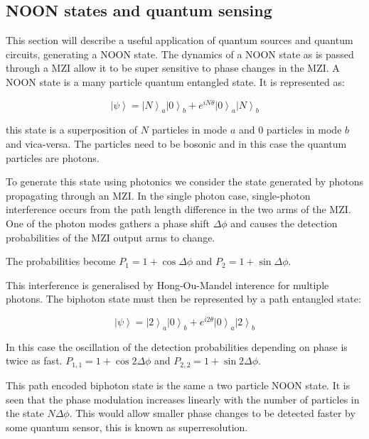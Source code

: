 \subsection{NOON states and quantum sensing}

This section will describe a useful application of quantum sources and quantum
circuits, generating a NOON state. The dynamics of a NOON state as is passed
through a MZI allow it to be super sensitive to phase changes in the MZI.
A NOON state is a many particle quantum entangled state. It is represented as:

\begin{equation} \left|\psi\right\rangle = \left|N\right\rangle_{a}
\left|0\right\rangle_{b} + e^{iN\theta} \left|0\right\rangle_{a}
\left|N\right\rangle_{b} \end{equation}

this state is a superposition of $N$ particles in mode $a$ and 0 particles in
mode $b$ and vica-versa. The particles need to be bosonic and in this case the
quantum particles are photons.

To generate this state using photonics we consider the state generated by
photons propagating through an MZI. In the single photon case, single-photon
interference occurs from the path length difference in the two arms of the MZI.
One of the photon modes gathers a phase shift $\Delta \phi$ and causes the
detection probabilities of the MZI output arms to change.

The probabilities become $P_1 = 1 + \cos{\Delta \phi}$ and $P_2 = 1 +
\sin{\Delta \phi}$.

This interference is generalised by Hong-Ou-Mandel interence \cite{hongoumandel}
for multiple photons. The biphoton state must then be represented by a path
entangled state:

\begin{equation} \left|\psi\right\rangle = \left|2\right\rangle_{a}
\left|0\right\rangle_{b} + e^{i2\theta} \left|0\right\rangle_{a}
\left|2\right\rangle_{b} \end{equation}

In this case the oscillation of the detection probabilities depending on phase
is twice as fast. $P_{1, 1} = 1 + \cos{2 \Delta \phi}$ and $P_{2, 2} = 1 +
\sin{2 \Delta \phi}$.

This path encoded biphoton state is the same a two particle NOON state. It is
seen that the phase modulation increases linearly with the number of particles
in the state $N\Delta \phi$. This would allow smaller phase changes to be
detected faster by some quantum sensor, this is known as superresolution.

